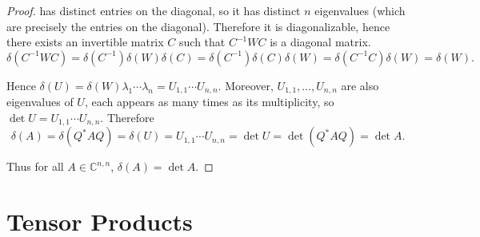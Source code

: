 \begin{proof}
    has distinct entries on the diagonal, so it has distinct $n$ eigenvalues (which are precisely the entries on the diagonal). Therefore it is diagonalizable, hence there exists an invertible matrix $C$ such that $C^{-1}WC$ is a diagonal matrix.
    \[
        \delta(C^{-1}WC) = \delta(C^{-1})\delta(W)\delta(C) = \delta(C^{-1})\delta(C)\delta(W) = \delta(C^{-1}C)\delta(W) = \delta(W).
    \]

    Hence $\delta(U) = \delta(W)\lambda_{1}\cdots\lambda_{n} = U_{1,1}\cdots U_{n,n}$. Moreover, $U_{1,1}, \ldots, U_{n,n}$ are also eigenvalues of $U$, each appears as many times as its multiplicity, so $\det U =  U_{1,1}\cdots U_{n,n}$. Therefore
    \[
        \delta(A) = \delta(Q^{*}AQ) = \delta(U) = U_{1,1}\cdots U_{n,n} = \det U = \det (Q^{*}AQ) = \det A.
    \]

    Thus for all $A\in\mathbb{C}^{n,n}$, $\delta(A) = \det A$.
\end{proof}
\newpage

\section{Tensor Products}

